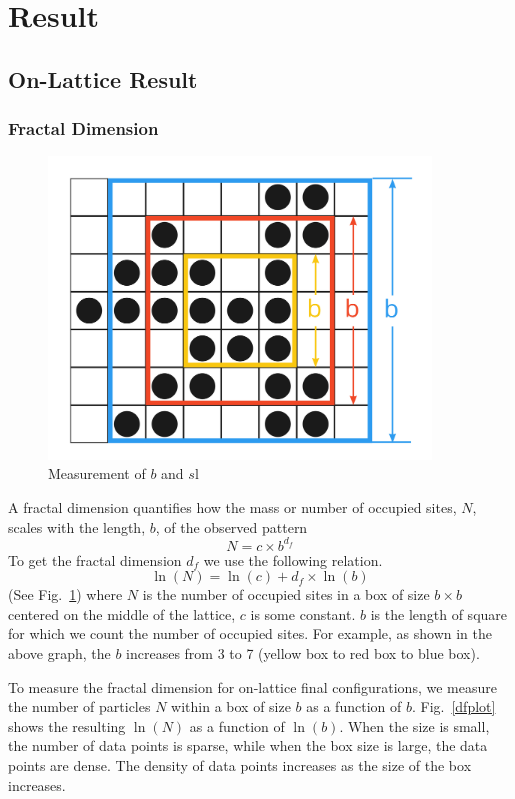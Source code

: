 \documentclass[aps,preprint,groupedaddress,letterpaper]{revtex4-1}
\begin{document}
\section{Result}
\subsection{On-Lattice Result}
\subsubsection{Fractal Dimension}
\begin{figure}[h]
\centering
\includegraphics[width=4.0in]{img/bs.jpg}
\caption{Measurement of $b$ and $s$l 
\label{bs}}
\end{figure}

A fractal dimension quantifies how the mass or number of occupied sites, $N$, scales with the length, $b$, of the observed pattern
\begin{equation}
    N = c \times b ^{d_f}
\end{equation}
To get the fractal dimension $d_f$ we use the following relation.
\begin{equation}
\label{eqn:lndf}
    \ln(N) = \ln(c) + d_f \times \ln(b)
\end{equation}
(See Fig.~\ref{bs}) where $N$ is the number of occupied sites in a box of size $b \times b$ centered on the middle of the lattice, $c$ is some constant. $b$ is the length of square for which we count the number of occupied sites. For example, as shown in the above graph, the $b$ increases from 3 to 7 (yellow box to red box to blue box). 

To measure the fractal dimension for on-lattice final configurations, we measure the number of particles $N$ within a box of size $b$ as a function of $b$. Fig.~\ref{dfplot} shows the resulting $\ln(N)$ as a function of $\ln(b)$. When the size is small, the number of data points is sparse, while when the box size is large, the data points are dense. The density of data points increases as the size of the box increases.
\end{document}
